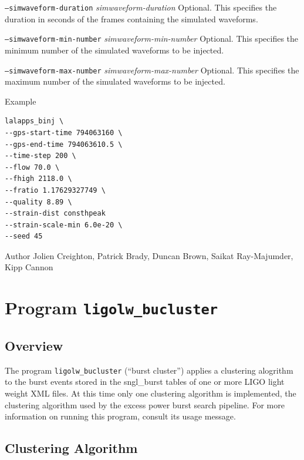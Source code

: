 \documentclass[10pt]{article}
\newcommand{\prog}[1]{\texttt{#1}}
\newcommand{\option}[1]{\texttt{#1}}
\newcommand{\parm}[1]{\textit{#1}}
\newenvironment{entry}%
{\begin{list}{}{\renewcommand{\makelabel}[1]%
{\parbox[b]{\labelwidth}{\makebox[0pt][l]{\textbf{##1}}\\}}%
\setlength{\labelwidth}{1em}%
\setlength{\labelsep}{1em}%
\setlength{\leftmargin}{2em}%
\setlength{\topsep}{\medskipamount}%
\setlength{\itemsep}{\medskipamount}%
\setlength{\parsep}{\medskipamount}%
\setlength{\listparindent}{0pt}}}
{\end{list}}
\begin{document}
\begin{entry}
\begin{entry}
\item[\option{--simwaveform-duration} \parm{simwaveform-duration}]
Optional.  This specifies the duration in seconds of the frames containing the simulated 
waveforms.

\item[\option{--simwaveform-min-number} \parm{simwaveform-min-number}] 
Optional.  This specifies the minimum number of the simulated waveforms to be injected.

\item[\option{--simwaveform-max-number} \parm{simwaveform-max-number}] 
Optional.  This specifies the maximum number of the simulated waveforms to be injected.  
\end{entry}

\item[Example]
\begin{verbatim}
lalapps_binj \
--gps-start-time 794063160 \
--gps-end-time 794063610.5 \
--time-step 200 \
--flow 70.0 \
--fhigh 2118.0 \
--fratio 1.17629327749 \
--quality 8.89 \
--strain-dist consthpeak
--strain-scale-min 6.0e-20 \
--seed 45
\end{verbatim}

\item[Author] 
Jolien Creighton, Patrick Brady, Duncan Brown, Saikat Ray-Majumder, Kipp
Cannon
\end{entry}

 
\section{Program \prog{ligolw\_bucluster}}


\subsection{Overview}


The program \prog{ligolw\_bucluster} (``burst cluster'') applies a
clustering alogrithm to the burst events stored in the sngl\_burst tables
of one or more LIGO light weight XML files.  At this time only one
clustering algorithm is implemented, the clustering algorithm used by the
excess power burst search pipeline.  For more information on running this
program, consult its usage message.


\subsection{Clustering Algorithm}
\end{document}
